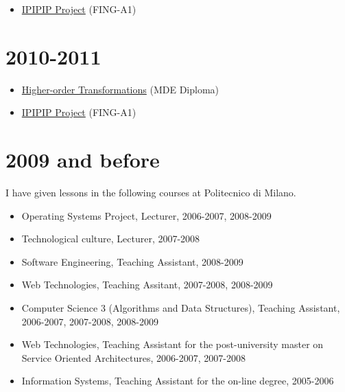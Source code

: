 \begin{itemize}
\tightlist
\item
  \href{https://campusneo.mines-nantes.fr/campus/course/view.php?id=391}{IPIPIP
  Project} (FING-A1)
\end{itemize}

\hypertarget{section-12}{%
\section{2010-2011}\label{section-12}}

\begin{itemize}
\tightlist
\item
  \href{http://web.emn.fr/x-info/atlanmod/index.php?title=The_MDE_Diploma}{Higher-order
  Transformations} (MDE Diploma)
\item
  \href{https://campusneo.mines-nantes.fr/campus/course/view.php?id=391}{IPIPIP
  Project} (FING-A1)
\end{itemize}

\hypertarget{and-before}{%
\section{2009 and before}\label{and-before}}

I have given lessons in the following courses at Politecnico di Milano.

\begin{itemize}
\tightlist
\item
  Operating Systems Project, Lecturer, 2006-2007, 2008-2009
\item
  Technological culture, Lecturer, 2007-2008
\item
  Software Engineering, Teaching Assistant, 2008-2009
\item
  Web Technologies, Teaching Assitant, 2007-2008, 2008-2009
\item
  Computer Science 3 (Algorithms and Data Structures), Teaching
  Assistant, 2006-2007, 2007-2008, 2008-2009
\item
  Web Technologies, Teaching Assistant for the post-university master on
  Service Oriented Architectures, 2006-2007, 2007-2008
\item
  Information Systems, Teaching Assistant for the on-line degree,
  2005-2006
\end{itemize}
